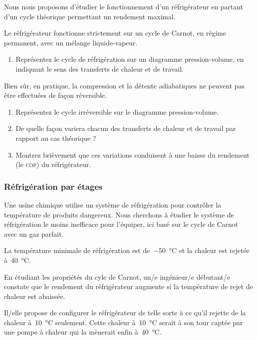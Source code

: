 	Nous nous proposons d’étudier le fonctionnement d’un réfrigérateur en partant d’un cycle théorique permettant un rendement maximal.
	
	Le réfrigérateur fonctionne strictement sur un cycle de Carnot, en régime permanent, avec un mélange liquide-vapeur.
	
	\begin{enumerate}
		\item Représentez le cycle de réfrigération sur un diagramme pression-volume, en indiquant le sens des transferts de chaleur et de travail.
	\end{enumerate}
	
	Bien sûr, en pratique, la compression et la détente adiabatiques ne peuvent pas être effectuées de façon réversible.
	
	\begin{enumerate}
		\item Représentez le cycle irréversible sur le diagramme pression-volume.
		\item De quelle façon variera chacun des transferts de chaleur et de travail par rapport au cas théorique ?
		\item Montrez brièvement que ces variations conduisent à une baisse du rendement (le \textsc{cop}) du réfrigérateur.
	\end{enumerate}


\subsubsection{Réfrigération par étages}
\label{exo_refrigeration_etages}
\wherefrom{[DS n°2 2012, 7pts]}

	Une usine chimique utilise un système de réfrigération pour contrôler la température de produits dangereux. Nous cherchons à étudier le système de réfrigération le moins inefficace pour l’équiper, ici basé sur le cycle de Carnot avec un gaz parfait.
	
	La température minimale de réfrigération est de~\SI{-50}{\degreeCelsius} et la chaleur est rejetée à~\SI{40}{\degreeCelsius}.
			
	En étudiant les propriétés du cyle de Carnot, un/e ingénieur/e débutant/e constate que le rendement du réfrigérateur augmente si la température de rejet de chaleur est abaissée.
	
	Il/elle propose de configurer le réfrigérateur de telle sorte à ce qu’il rejette de la chaleur à~\SI{10}{\degreeCelsius} seulement. Cette chaleur à~\SI{10}{\degreeCelsius} serait à son tour captée par une pompe à chaleur qui la mènerait enfin à~\SI{40}{\degreeCelsius}. 
	
